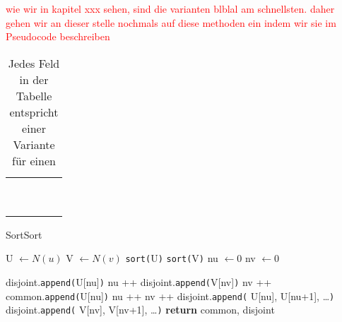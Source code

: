 

\textcolor{red}{wie wir in kapitel xxx sehen, sind die varianten blblal am schnellsten. daher gehen wir 
an dieser stelle nochmals auf diese methoden ein indem wir sie im Pseudocode beschreiben}


\begin{table}
	\centering
	\begin{tabular}{c||c|c||c|c}
		 & \multicolumn{2}{c||}{\distr} & \multicolumn{2}{c}{\perm} \\
		 & \true & \false & \true & \false
		\\ \hline\hline
		\SorSor & & & & \\ \hline\hline
		\SeaSor & & & &\\ \hline\hline
		\SorSea & & & &\\ \hline\hline
		\SeaSet & & & &\\ \hline\hline
		\SetSea & & & &\\ \hline\hline
		\SeaUSet & & & &\\ \hline\hline
		\USetSea& & & &
	\end{tabular}
	\label{tab:varianten_curveball_tausch}
	\caption{Jedes Feld in der Tabelle entspricht einer Variante für einen \ct{}}
\end{table}


\begin{algorithm}
  \caption{SortSort}\label{algo:sortsort}
  \begin{algorithmic}[1]
	  \State U $ \gets N(u)$ 
	  \State V $ \gets N(v)$ 
	  \State \texttt{sort(}U\texttt{)} \label{algo:inv1} 
	  \State \texttt{sort(}V\texttt{)} \label{algo:inv2}
	  \State nu $\gets 0$ 
	  \State nv $\gets 0$ 
	  
			\State disjoint.\texttt{append(}U[nu]\texttt{)}
			\State nu ++
				\State disjoint.\texttt{append(}V[nv]\texttt{)}
				\State nv ++
				\State common.\texttt{append(}U[nu]\texttt{)}
				\State nu ++
				\State nv ++
        \EndIf
      \EndWhile\label{euclidendwhile}
			\State disjoint.\texttt{append(} U[nu], U[nu+1], \dots\texttt{)}
			\Else{}
			\State disjoint.\texttt{append(} V[nv], V[nv+1], \dots\texttt{)}
      \EndIf
      \State \textbf{return} common, disjoint
   \EndProcedure
  \end{algorithmic}
\end{algorithm}


